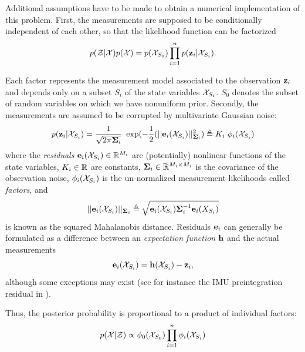 Additional assumptions have to be made to obtain a numerical implementation of this problem.
First, the measurements are supposed to be conditionally independent of each other, so that the likelihood function can be factorized 
%
\begin{equation}
    p(\mathcal{Z} | \mathcal{X}) p(\mathcal{X}) =  p(\mathcal{X}_{S_0}) \prod_{i=1}^{n} p({\bf z}_i | \mathcal{X}_{S_i}).
\end{equation}

Each factor represents the measurement model associated to the  observation ${\bf z}_i$ and depends only on a subset $S_i$ of the state variables $\mathcal{X}_{S_i}$. 
$S_0$ denotes the subset of random variables on which we have nonuniform prior.
Secondly, the measurements are assumed to be corrupted by multivariate Gaussian noise:
%
\begin{equation}
    p({\bf z}_i | \mathcal{X}_{S_i}) = \frac{1}{\sqrt{2\pi{\bm \Sigma}_i}} ~ \exp(- \frac{1}{2} (||{\bf e}_i(\mathcal{X}_{S_i})||^2_{{\bm \Sigma}_i}) \triangleq K_i~\phi_i(\mathcal{X}_{S_i})
\end{equation}
%
where the \textit{residuals} ${\bf e}_i(\mathcal{X}_{S_i}) \in \mathbb{R}^{M_i}$ are (potentially) nonlinear functions of the state variables, $K_i \in \mathbb{R}$ are constants, 
${\bm \Sigma}_i \in \mathbb{R}^{M_i \times M_i}$ is the covariance of the observation noise,
$\phi_i(\mathcal{X}_{S_i})$ is the un-normalized measurement likelihoods called \textit{factors}, and 
%
\begin{equation*}
    ||{\bf e}_i(\mathcal{X}_{S_i})||_{{\bm \Sigma}_i} \triangleq \sqrt{{\bf e}_i(\mathcal{X}_{S_i}) {\bm \Sigma}_i^{-1} {\bf e}_i(X_{S_i})}
\end{equation*}
%
is known as the squared Mahalanobis distance. 
Residuals ${\bf e}_i$ can generally be formulated as a difference between an \textit{expectation function} ${\bf h}$ and the actual measurements
%
\begin{equation}
    {\bf e}_i(\mathcal{X}_{S_i}) = {\bf h}(\mathcal{X}_{S_i}) - {\bf z}_i,
    \label{eq:error_expectation}
\end{equation}
%
although some exceptions may exist (see for instance the IMU preintegration residual  in ).

Thus, the posterior probability is proportional to a product of individual factors:
%
\begin{equation}
    p(\mathcal{X} | \mathcal{Z}) \propto \phi_0(\mathcal{X}_{S_0}) \prod_{i=1}^{n} \phi_i(\mathcal{X}_{S_i}) 
    \label{eq:likelihood_factorization}
\end{equation}

